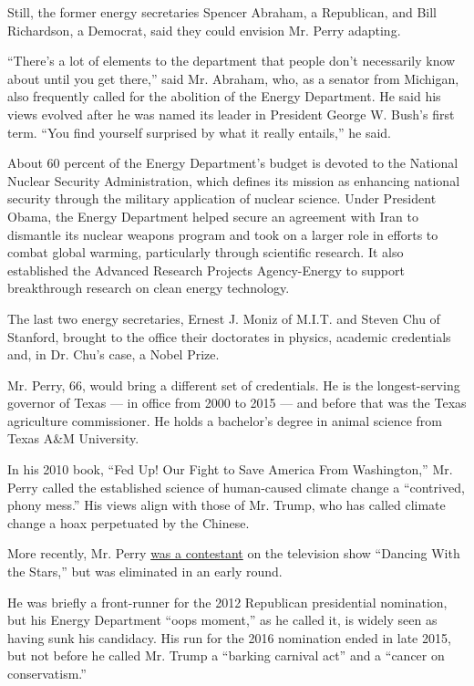 Still, the former energy secretaries Spencer Abraham, a Republican, and
Bill Richardson, a Democrat, said they could envision Mr. Perry
adapting.

``There's a lot of elements to the department that people don't
necessarily know about until you get there,'' said Mr. Abraham, who, as
a senator from Michigan, also frequently called for the abolition of the
Energy Department. He said his views evolved after he was named its
leader in President George W. Bush's first term. ``You find yourself
surprised by what it really entails,'' he said.

About 60 percent of the Energy Department's budget is devoted to the
National Nuclear Security Administration, which defines its mission as
enhancing national security through the military application of nuclear
science. Under President Obama, the Energy Department helped secure an
agreement with Iran to dismantle its nuclear weapons program and took on
a larger role in efforts to combat global warming, particularly through
scientific research. It also established the Advanced Research Projects
Agency-Energy to support breakthrough research on clean energy
technology.

The last two energy secretaries, Ernest J. Moniz of M.I.T. and Steven
Chu of Stanford, brought to the office their doctorates in physics,
academic credentials and, in Dr. Chu's case, a Nobel Prize.

Mr. Perry, 66, would bring a different set of credentials. He is the
longest-serving governor of Texas --- in office from 2000 to 2015 ---
and before that was the Texas agriculture commissioner. He holds a
bachelor's degree in animal science from Texas A\&M University.

In his 2010 book, ``Fed Up! Our Fight to Save America From Washington,''
Mr. Perry called the established science of human-caused climate change
a ``contrived, phony mess.'' His views align with those of Mr. Trump,
who has called climate change a hoax perpetuated by the Chinese.

More recently, Mr. Perry
\href{https://www.youtube.com/watch?v=zKbjy3mTXPE\&t=63s}{was a
contestant} on the television show ``Dancing With the Stars,'' but was
eliminated in an early round.

He was briefly a front-runner for the 2012 Republican presidential
nomination, but his Energy Department ``oops moment,'' as he called it,
is widely seen as having sunk his candidacy. His run for the 2016
nomination ended in late 2015, but not before he called Mr. Trump a
``barking carnival act'' and a ``cancer on conservatism.''


